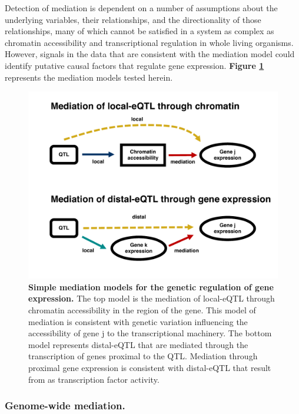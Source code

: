 \documentclass[9pt,twocolumn,twoside]{gsajnl}
\begin{document}
Detection of mediation is dependent on a number of assumptions about the underlying variables, their relationships, and the directionality of those relationships, many of which cannot be satisfied in a system as complex as chromatin accessibility and transcriptional regulation in whole living organisms. However, signals in the data that are consistent with the mediation model could identify putative causal factors that regulate gene expression. \textbf{Figure \ref{fig:graph}} represents the mediation models tested herein.

\begin{figure}[htbp]
\renewcommand{\familydefault}{\sfdefault}\normalfont
\centering
\includegraphics[width=\linewidth, page=1, clip, trim={0in 0.5in 0in 0in}]{figs/mediation_graph.pdf}
\caption{\textbf{Simple mediation models for the genetic regulation of gene expression.} The top model is the mediation of local-eQTL through chromatin accessibility in the region of the gene. This model of mediation is consistent with genetic variation influencing the accessibility of gene j to the transcriptional machinery. The bottom model represents distal-eQTL that are mediated through the transcription of genes proximal to the QTL. Mediation through proximal gene expression is consistent with distal-eQTL that result from as transcription factor activity. 
\label{fig:graph}}
\end{figure}

\subsubsection{Genome-wide mediation.}
\end{document}
